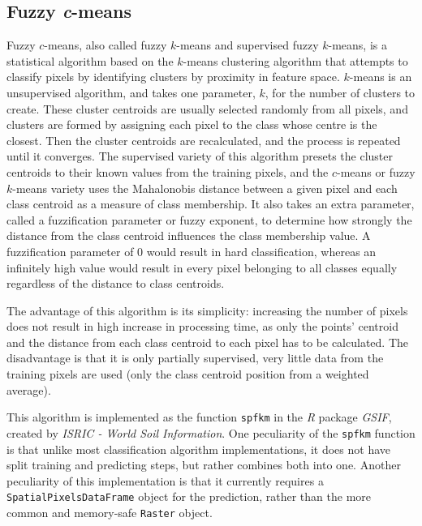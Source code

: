 \documentclass[a4paper,10pt]{book}
\begin{document}
\subsection{Fuzzy \textit{c}-means}

Fuzzy $c$-means, also called fuzzy $k$-means and supervised fuzzy $k$-means, is a statistical algorithm based on the $k$-means clustering algorithm that attempts to classify pixels by identifying clusters by proximity in feature space. $k$-means is an unsupervised algorithm, and takes one parameter, $k$, for the number of clusters to create. These cluster centroids are usually selected randomly from all pixels, and clusters are formed by assigning each pixel to the class whose centre is the closest. Then the cluster centroids are recalculated, and the process is repeated until it converges. The supervised variety of this algorithm presets the cluster centroids to their known values from the training pixels, and the $c$-means or fuzzy $k$-means variety uses the Mahalonobis distance between a given pixel and each class centroid as a measure of class membership. It also takes an extra parameter, called a fuzzification parameter or fuzzy exponent, to determine how strongly the distance from the class centroid influences the class membership value. A fuzzification parameter of 0 would result in hard classification, whereas an infinitely high value would result in every pixel belonging to all classes equally regardless of the distance to class centroids. \citep{hengl2004fuzzycmeans}

The advantage of this algorithm is its simplicity: increasing the number of pixels does not result in high increase in processing time, as only the points' centroid and the distance from each class centroid to each pixel has to be calculated. The disadvantage is that it is only partially supervised, very little data from the training pixels are used (only the class centroid position from a weighted average).

This algorithm is implemented as the function \texttt{spfkm} in the \textit{R} package \textit{GSIF}, created by \textit{ISRIC - World Soil Information}. One peculiarity of the \texttt{spfkm} function is that unlike most classification algorithm implementations, it does not have split training and predicting steps, but rather combines both into one. Another peculiarity of this implementation is that it currently requires a \texttt{SpatialPixelsDataFrame} object for the prediction, rather than the more common and memory-safe \texttt{Raster} object.
\end{document}
